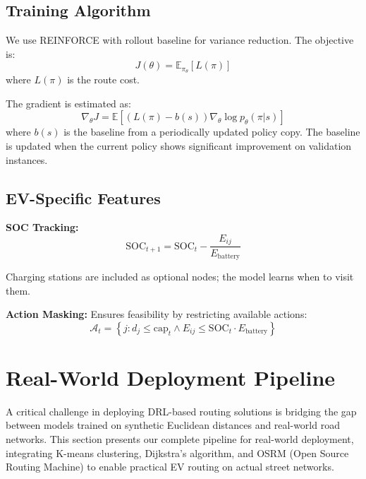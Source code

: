 \documentclass[11pt,a4paper]{article}
\begin{document}
\subsection{Training Algorithm}

We use REINFORCE with rollout baseline for variance reduction. The objective is:
\begin{equation}
J(\theta) = \mathbb{E}_{\pi_\theta}\left[ L(\pi) \right]
\end{equation}
where $L(\pi)$ is the route cost.

The gradient is estimated as:
\begin{equation}
\nabla_\theta J = \mathbb{E}\left[ \left( L(\pi) - b(s) \right) \nabla_\theta \log p_\theta(\pi | s) \right]
\end{equation}
where $b(s)$ is the baseline from a periodically updated policy copy. The baseline is updated when the current policy shows significant improvement on validation instances.

\subsection{EV-Specific Features}

\textbf{SOC Tracking:}
\begin{equation}
\text{SOC}_{t+1} = \text{SOC}_t - \frac{E_{ij}}{E_{\text{battery}}}
\end{equation}

Charging stations are included as optional nodes; the model learns when to visit them.

\textbf{Action Masking:} Ensures feasibility by restricting available actions:
\begin{equation}
\mathcal{A}_t = \left\{ j : d_j \leq \text{cap}_t \land E_{ij} \leq \text{SOC}_t \cdot E_{\text{battery}} \right\}
\end{equation}

\section{Real-World Deployment Pipeline}

A critical challenge in deploying DRL-based routing solutions is bridging the gap between models trained on synthetic Euclidean distances and real-world road networks. This section presents our complete pipeline for real-world deployment, integrating K-means clustering, Dijkstra's algorithm, and OSRM (Open Source Routing Machine) to enable practical EV routing on actual street networks.
\end{document}
